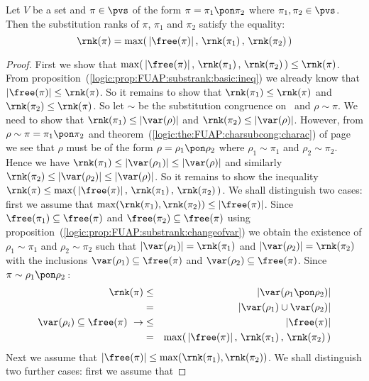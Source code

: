 \begin{prop}\label{logic:prop:FUAP:substrank:recursion:pon}
Let $V$ be a set and $\pi\in\pvs$ of the form
$\pi=\pi_{1}\pon\pi_{2}$ where $\pi_{1},\pi_{2}\in\pvs$. Then the
substitution ranks of $\pi$, $\pi_{1}$ and $\pi_{2}$ satisfy the
equality:
    \[
    \rnk(\pi)=\max(\,|\free(\pi)|\,,\,\rnk(\pi_{1})\,,\,\rnk(\pi_{2})\,)
    \]
\end{prop}
\begin{proof}
First we show that
$\max(\,|\free(\pi)|\,,\,\rnk(\pi_{1})\,,\,\rnk(\pi_{2})\,)\leq\rnk(\pi)$.
From proposition~(\ref{logic:prop:FUAP:substrank:basic:ineq}) we
already know that $|\free(\pi)|\leq\rnk(\pi)$. So it remains to show
that $\rnk(\pi_{1})\leq\rnk(\pi)$ and $\rnk(\pi_{2})\leq\rnk(\pi)$.
So let $\sim$ be the substitution congruence on \pvs\ and
$\rho\sim\pi$. We need to show that $\rnk(\pi_{1})\leq|\var(\rho)|$
and $\rnk(\pi_{2})\leq|\var(\rho)|$. However, from
$\rho\sim\pi=\pi_{1}\pon\pi_{2}$ and
theorem~(\ref{logic:the:FUAP:charsubcong:charac}) of
page~\pageref{logic:the:FUAP:charsubcong:charac} we see that $\rho$
must be of the form $\rho=\rho_{1}\pon\rho_{2}$ where
$\rho_{1}\sim\pi_{1}$ and $\rho_{2}\sim\pi_{2}$. Hence we have
$\rnk(\pi_{1})\leq|\var(\rho_{1})|\leq|\var(\rho)|$ and similarly
$\rnk(\pi_{2})\leq|\var(\rho_{2})|\leq|\var(\rho)|$. So it remains
to show the inequality
$\rnk(\pi)\leq\max(\,|\free(\pi)|\,,\,\rnk(\pi_{1})\,,\,\rnk(\pi_{2})\,)$.
We shall distinguish two cases: first we assume that
$\max(\rnk(\pi_{1}),\rnk(\pi_{2}))\leq|\free(\pi)|$. Since
$\free(\pi_{1})\subseteq\free(\pi)$ and
$\free(\pi_{2})\subseteq\free(\pi)$ using
proposition~(\ref{logic:prop:FUAP:substrank:changeofvar}) we obtain
the existence of $\rho_{1}\sim\pi_{1}$ and $\rho_{2}\sim\pi_{2}$
such that $|\var(\rho_{1})|=\rnk(\pi_{1})$ and
$|\var(\rho_{2})|=\rnk(\pi_{2})$ with the inclusions
$\var(\rho_{1})\subseteq\free(\pi)$ and
$\var(\rho_{2})\subseteq\free(\pi)$. Since
$\pi\sim\rho_{1}\pon\rho_{2}$\,:
    \begin{eqnarray*}
    \rnk(\pi)&\leq&|\var(\rho_{1}\pon\rho_{2})|\\
    &=&|\var(\rho_{1})\cup\var(\rho_{2})|\\
    \var(\rho_{i})\subseteq\free(\pi)\ \rightarrow&\leq&|\free(\pi)|\\
    &=&\max(\,|\free(\pi)|\,,\,\rnk(\pi_{1})\,,\,\rnk(\pi_{2})\,)
    \end{eqnarray*}
Next we assume that
$|\free(\pi)|\leq\max(\rnk(\pi_{1}),\rnk(\pi_{2}))$. We shall
distinguish two further cases: first we assume that

\end{proof}
